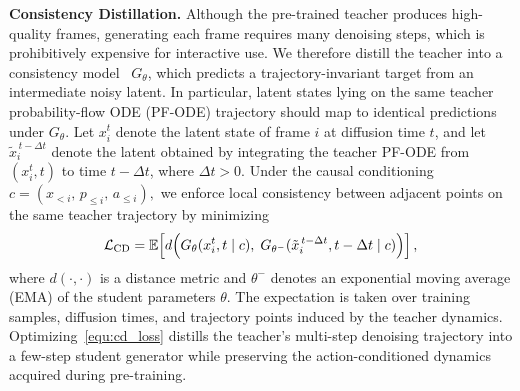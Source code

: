 %
\noindent\textbf{Consistency Distillation.}
Although the pre-trained teacher produces high-quality frames, generating each frame requires many denoising steps, which is prohibitively expensive for interactive use.
%
We therefore distill the teacher into a consistency model~\cite{song2023consistency, lin2025apt2, zheng2026rcm, zhu2026causal} $G_\theta$, which predicts a trajectory-invariant target from an intermediate noisy latent.
%
In particular, latent states lying on the same teacher probability-flow ODE (PF-ODE) trajectory should map to identical predictions under $G_\theta$.
%
Let $x_i^t$ denote the latent state of frame $i$ at diffusion time $t$, and let $\tilde{x}_i^{\,t-\Delta t}$ denote the latent obtained by integrating the teacher PF-ODE from $(x_i^t, t)$ to time $t-\Delta t$, where $\Delta t > 0$.
%
Under the causal conditioning $c = (x_{<i},\, p_{\le i},\, a_{\le i}),$ we enforce local consistency between adjacent points on the same teacher trajectory by minimizing
\begin{equation}
\label{equ:cd_loss}
    \mathcal{L}_{\mathrm{CD}}
    =
    \mathbb{E}\!\left[
    d\!\left(
    G_\theta(x_i^t, t \mid c),\;
    G_{\theta^-}(\tilde{x}_i^{\,t-\Delta t}, t-\Delta t \mid c)
    \right)
    \right],
\end{equation}
where $d(\cdot,\cdot)$ is a distance metric and $\theta^-$ denotes an exponential moving average (EMA) of the student parameters $\theta$.
%
The expectation is taken over training samples, diffusion times, and trajectory points induced by the teacher dynamics. 
%
Optimizing~\cref{equ:cd_loss} distills the teacher's multi-step denoising trajectory into a few-step student generator while preserving the action-conditioned dynamics acquired during pre-training.

